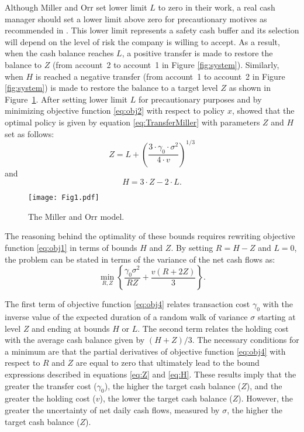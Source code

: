 Although Miller and Orr set lower limit $L$ to zero in their work, a real cash manager should set a lower limit above zero for precautionary motives as recommended in \cite{ross2002fundamentals}. This lower limit represents a safety cash buffer and its selection will depend on the level of risk the company is willing to accept. As a result, when the cash balance reaches $L$, a positive transfer is made to restore the balance to $Z$ (from account~2 to account~1 in Figure \ref{fig:system}). Similarly, when $H$ is reached a negative transfer (from account~1 to account~2 in Figure \ref{fig:system}) is made to restore the balance to a target level $Z$ as shown in Figure~\ref{fig:MillerOrrModel}. After setting lower limit $L$ for precautionary purposes and by minimizing objective function \eqref{eq:obj2} with respect to policy $x$, \cite{miller1966model} showed that the optimal policy is given by equation \eqref{eq:TransferMiller} with parameters $Z$ and $H$ set as follows:
\begin{equation}
Z=L+\left(\frac{3 \cdot \gamma_0 \cdot  \sigma^2}{4 \cdot v}\right)^{1/3}
\label{eq:Z}
\end{equation}
and
\begin{equation}
H=3 \cdot Z-2 \cdot L.
\label{eq:H}
\end{equation}


\begin{figure}[!htb]
\centering
\texttt{[image: Fig1.pdf]}
\caption{\label{fig:MillerOrrModel}The Miller and Orr model.} 
\end{figure}


The reasoning behind the optimality of these bounds requires rewriting objective function \eqref{eq:obj1} in terms of bounds $H$ and $Z$. By setting $R=H-Z$ and $L=0$, the problem can be stated in terms of the variance of the net cash flows as:
\begin{equation}
\min_{R,Z} \left\lbrace \frac{\gamma_0 \sigma^2}{RZ}+\frac{v(R+2Z)}{3} \right\rbrace.
\label{eq:obj4}
\end{equation}

The first term of objective function \eqref{eq:obj4} relates transaction cost $\gamma_0$ with the inverse value of the expected duration of a random walk of variance $\sigma$ starting at level $Z$ and ending at bounds $H$ or $L$. The second term relates the holding cost with the average cash balance given by $(H+Z)/3$. The necessary conditions for a minimum are that the partial derivatives of objective function \eqref{eq:obj4} with respect to $R$ and $Z$ are equal to zero that ultimately lead to the bound expressions described in equations \eqref{eq:Z} and \eqref{eq:H}. These results imply that the greater the transfer cost ($\gamma_0$), the higher the target cash balance ($Z$), and the greater the holding cost ($v$), the lower the target cash balance ($Z$). However, the greater the uncertainty of net daily cash flows, measured by $\sigma$, the higher the target cash balance ($Z$). 


